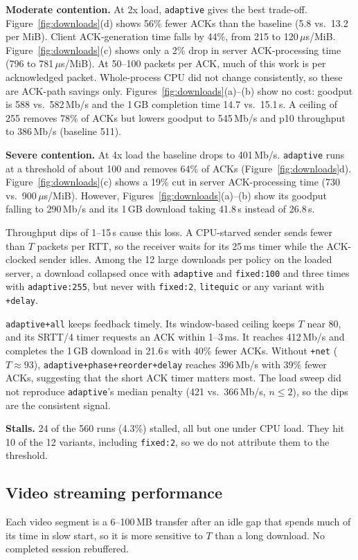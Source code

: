 \documentclass[11pt]{article}
\newcommand{\pol}[1]{\texttt{#1}}            %
\newcommand{\para}[1]{\textbf{#1}} %
\newcommand{\ms}{\,ms}
\newcommand{\mbps}{\,Mb/s}
\begin{document}
\para{Moderate contention.} At 2x load, \pol{adaptive} gives the best trade-off.
Figure~\ref{fig:downloads}(d) shows 56\% fewer ACKs than the baseline (5.8 vs.\ 13.2 per MiB).
Client ACK-generation time falls by 44\%, from 215 to 120\,$\mu$s/MiB.
Figure~\ref{fig:downloads}(c) shows only a 2\% drop in server ACK-processing time (796 to
781\,$\mu$s/MiB). At 50--100 packets per ACK, much of this work is per acknowledged packet.
Whole-process CPU did not change consistently, so these are ACK-path savings only.
Figures~\ref{fig:downloads}(a)--(b) show no cost: goodput is 588 vs.\ 582\mbps{} and the 1\,GB
completion time 14.7 vs.\ 15.1\,s. A ceiling of 255 removes 78\% of ACKs but lowers goodput to
545\mbps{} and p10 throughput to 386\mbps{} (baseline 511).

\para{Severe contention.} At 4x load the baseline drops to 401\mbps. \pol{adaptive} runs at a
threshold of about 100 and removes 64\% of ACKs (Figure~\ref{fig:downloads}d).
Figure~\ref{fig:downloads}(c) shows a 19\% cut in server ACK-processing time (730 vs.\
900\,$\mu$s/MiB). However, Figures~\ref{fig:downloads}(a)--(b) show its goodput falling to
290\mbps{} and its 1\,GB download taking 41.8\,s instead of 26.8\,s.

Throughput dips of 1--15\,s cause this loss. A CPU-starved sender sends fewer than $T$ packets
per RTT, so the receiver waits for its 25\ms{} timer while the ACK-clocked sender idles. Among the 12
large downloads per policy on the loaded server, a download collapsed once with \pol{adaptive} and
\pol{fixed:100} and three times with \pol{adaptive:255}, but never with \pol{fixed:2},
\pol{litequic} or any variant with \pol{+delay}.

\pol{adaptive+all} keeps feedback timely. Its window-based ceiling keeps $T$ near 80, and its
SRTT/4 timer requests an ACK within 1--3\ms. It reaches 412\mbps{} and completes the 1\,GB download
in 21.6\,s with 40\% fewer ACKs. Without \pol{+net} ($T{\approx}93$),
\pol{adaptive+phase+reorder+delay} reaches 396\mbps{} with 39\% fewer ACKs, suggesting that the
short ACK timer matters most. The load sweep did not reproduce \pol{adaptive}'s median penalty (421 vs.\
366\mbps, $n{\le}2$), so the dips are the consistent signal.

\para{Stalls.} 24 of the 560 runs (4.3\%) stalled, all but one under CPU load. They hit 10 of the
12 variants, including \pol{fixed:2}, so we do not attribute them to the threshold.

\FloatBarrier
\subsection{Video streaming performance}
Each video segment is a 6--100\,MB transfer after an idle gap that spends much of its time in slow
start, so it is more sensitive to $T$ than a long download. No completed session rebuffered.
\end{document}
